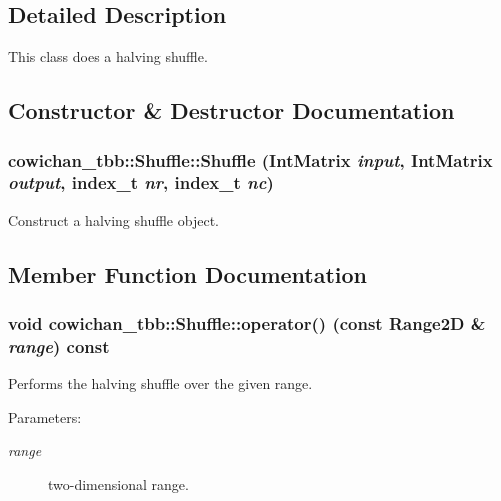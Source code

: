 \subsection{Detailed Description}
This class does a halving shuffle. 

\subsection{Constructor \& Destructor Documentation}
\hypertarget{classcowichan__tbb_1_1_shuffle_76e886c3ce66eb96f5202a4d30b2d207}{
\subsubsection[{Shuffle}]{\setlength{\rightskip}{0pt plus 5cm}cowichan\_\-tbb::Shuffle::Shuffle ({\bf IntMatrix} {\em input}, \/  {\bf IntMatrix} {\em output}, \/  {\bf index\_\-t} {\em nr}, \/  {\bf index\_\-t} {\em nc})}}
\label{classcowichan__tbb_1_1_shuffle_76e886c3ce66eb96f5202a4d30b2d207}


Construct a halving shuffle object. 

\subsection{Member Function Documentation}
\hypertarget{classcowichan__tbb_1_1_shuffle_8fd5ad3e9928c89c44c134af274e51a7}{
\subsubsection[{operator()}]{\setlength{\rightskip}{0pt plus 5cm}void cowichan\_\-tbb::Shuffle::operator() (const {\bf Range2D} \& {\em range}) const}}
\label{classcowichan__tbb_1_1_shuffle_8fd5ad3e9928c89c44c134af274e51a7}


Performs the halving shuffle over the given range. \begin{Desc}
\item[Parameters:]
\begin{description}
\item[{\em range}]two-dimensional range. \end{description}
\end{Desc}


